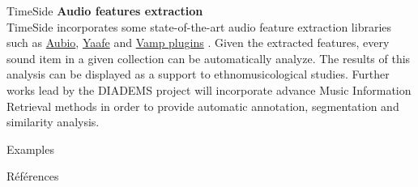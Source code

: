 \documentclass[final, hyperref, table]{beamer}
\begin{document}
\begin{frame}{}
\begin{columns}[t]
\begin{column}[T]{.49\linewidth}
\begin{block}{TimeSide}
\textbf{Audio features extraction}\\
TimeSide incorporates some state-of-the-art audio feature extraction libraries such as \href{http://aubio.org}{Aubio}, \href{http://yaafe.sourceforge.net}{Yaafe} and \href{http://www.vamp-plugins.org}{Vamp plugins} \cite{brossierPhD,yaafe_ISMIR2010,vamp-plugins}.
Given the extracted features, every sound item in a given collection can be automatically analyze. The results of this analysis can be displayed as a support to ethnomusicological studies.
Further works lead by the DIADEMS project will incorporate advance Music Information Retrieval methods in order to provide automatic annotation, segmentation and similarity analysis.
  \end{block}
  \begin{block}{Examples}\small
    
  \end{block}
\begin{block}{Références}\tiny

\vspace{-1cm}
\begin{multicols}{2}[]

\end{multicols}
  \end{block}
 \end{column}
\end{columns}
\end{frame}
\end{document}
